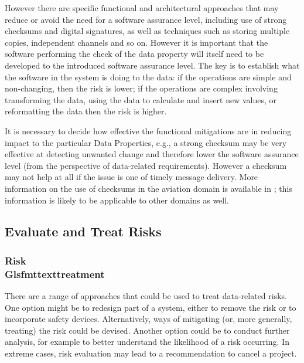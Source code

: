 However there are specific functional and architectural approaches that may reduce or avoid the need for a \gls{software assurance level}, including use of strong checksums and digital signatures, as well as techniques such as storing multiple copies, independent channels and so on. However it is important that the software performing the check of the \gls{data property} will itself need to be developed to the introduced \gls{software assurance level}. The key is to establish what the software in the system is doing to the data: if the operations are simple and non-changing, then the risk is lower; if the operations are complex involving transforming the data, using the data to calculate and insert new values, or reformatting the data then the risk is higher.

It is necessary to decide how effective the functional mitigations are in reducing impact to the particular Data Properties, e.g., a strong checksum may be very effective at detecting unwanted change and therefore lower the \gls{software assurance level} (from the perspective of data-related requirements). However a checksum may not help at all if the issue is one of timely message delivery. More \gls{information} on the use of checksums in the aviation domain is available in \cite{citation:koopman2015selection}; this \gls{information} is likely to be applicable to other domains as well.

\clearpage %
\subsection{Evaluate and Treat Risks}
\label{bkm:EvaluateAndTreat}
\subsubsection{Risk \\Glsfmttext{treatment}}
There are a range of approaches that could be used to treat data-related risks. One option might be to redesign part of a system, either to remove the risk or to incorporate safety devices. Alternatively, ways of mitigating (or, more generally, treating) the risk could be devised. Another option could be to conduct further analysis, for example to better understand the likelihood of a risk occurring. In extreme cases, risk evaluation may lead to a recommendation to cancel a project.

